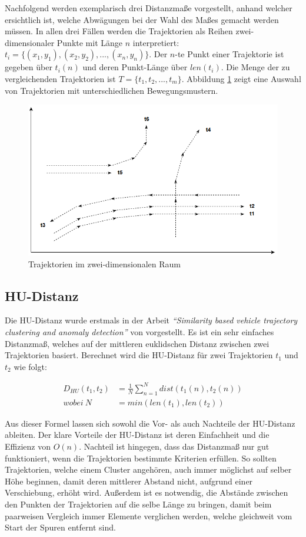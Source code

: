 Nachfolgend werden exemplarisch drei Distanzmaße vorgestellt, anhand welcher ersichtlich ist, welche Abwägungen
bei der Wahl des Maßes gemacht werden müssen.
In allen drei Fällen werden die Trajektorien als Reihen zwei-dimensionaler Punkte mit Länge $n$ interpretiert:
$t_i = \{(x_1, y_1), (x_2, y_2), ..., (x_n, y_n)\}$.
Der $n$-te Punkt einer Trajektorie ist gegeben über $t_i(n)$ und deren Punkt-Länge über $len(t_i)$.
Die Menge der zu vergleichenden Trajektorien ist $T = \{t_1, t_2, ..., t_m\}$.
Abbildung \ref{fig:grund_trajectories} zeigt eine Auswahl von Trajektorien mit unterschiedlichen Bewegungsmustern.

\begin{figure}[H]
    \centering
    \includegraphics[width=0.6\linewidth]{resources/img/grundlagen/trajectories}
    \caption{Trajektorien im zwei-dimensionalen Raum}
    \label{fig:grund_trajectories}
\end{figure}

\subsection{HU-Distanz}
\label{sec:hu_distance}

Die HU-Distanz wurde erstmals in der Arbeit \textit{``Similarity based vehicle trajectory clustering and anomaly detection''}
von \cite[]{Hu2005} vorgestellt. Es ist ein sehr einfaches Distanzmaß, welches auf der mittleren euklidschen Distanz
zwischen zwei Trajektorien basiert. Berechnet wird die HU-Distanz für zwei Trajektorien $t_1$ und $t_2$ wie folgt:

\begin{ceqn}
\begin{align}
\label{eq_hu_distance1}
    D_{HU}(t_1, t_2) &= \frac{1}{N} \sum_{n = 1}^N dist(t_1(n), t_2(n)) \\
\label{eq_hu_distance2}
    wobei\ N &= min(len(t_1), len(t_2))
\end{align}
\end{ceqn}

Aus dieser Formel lassen sich sowohl die Vor- als auch Nachteile der HU-Distanz ableiten. Der klare Vorteile der
HU-Distanz ist deren Einfachheit und die Effizienz von $O(n)$.
Nachteil ist hingegen, dass das Distanzmaß nur gut funktioniert, wenn die Trajektorien bestimmte
Kriterien erfüllen. So sollten Trajektorien, welche einem Cluster angehören, auch immer möglichst auf selber Höhe beginnen,
damit deren mittlerer Abstand nicht, aufgrund einer Verschiebung, erhöht wird.
Außerdem ist es notwendig, die Abstände zwischen den Punkten der Trajektorien auf die selbe Länge zu bringen,
damit beim paarweisen Vergleich immer Elemente verglichen werden, welche gleichweit vom Start der Spuren entfernt sind.

